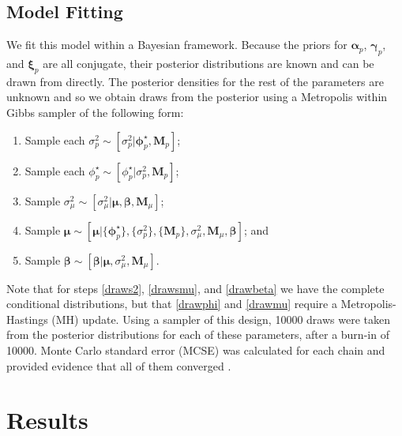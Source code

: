 \documentclass[final]{statsoc}
\begin{document}
\subsection{Model Fitting}
We fit this model within a Bayesian framework. Because the priors
for $\boldsymbol{\alpha}_p$, $\boldsymbol{\gamma}_p$, and $\boldsymbol{\xi}_p$ are all conjugate, their posterior
distributions are known and can be drawn from directly. The posterior densities for the rest of the parameters are unknown and so we obtain draws from the posterior using a Metropolis within Gibbs sampler of the following form:
\begin{enumerate}
  \item \label{draws2} Sample each $\sigma^2_p \sim [ \sigma^2_p | \boldsymbol{\phi}^\star_p, \mathbf{M}_p]$;
  \item \label{drawphi} Sample each $\phi^\star_p \sim [ \phi^\star_p | \sigma^2_p, \mathbf{M}_p ]$;
  \item \label{drawsmu} Sample $\sigma^2_\mu \sim [ \sigma^2_\mu | \boldsymbol{\mu}, \boldsymbol{\beta}, 
    \mathbf{M}_\mu ]$;
  \item \label{drawmu} Sample $\boldsymbol{\mu} \sim [ \boldsymbol{\mu} | \{\boldsymbol{\phi}^\star_p\}, 
    \{\sigma^2_p\}, \{\mathbf{M}_p\}, \sigma^2_\mu, \mathbf{M}_\mu, \boldsymbol{\beta} ]$; and
  \item \label{drawbeta} Sample $\boldsymbol{\beta} \sim [ \boldsymbol{\beta} | \boldsymbol{\mu}, 
    \sigma^2_\mu, \mathbf{M}_\mu ]$.
\end{enumerate}

Note that for steps \ref{draws2}, \ref{drawsmu}, and \ref{drawbeta} we have the complete conditional distributions, but that \ref{drawphi} and \ref{drawmu} require a Metropolis-Hastings (MH) update. Using a sampler of this design, 10000 draws were taken from the posterior distributions for each of these parameters, after a burn-in of 10000. Monte Carlo standard error (MCSE) was calculated for each chain and provided evidence that all of them converged \citep{Flegal2015}. 


\section{Results}\label{results}
\end{document}
